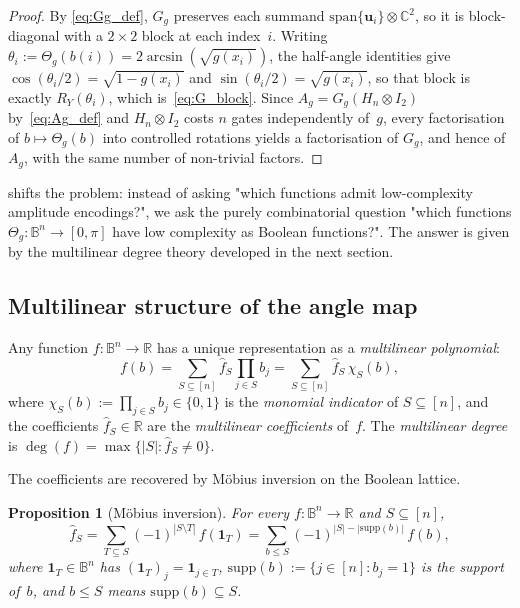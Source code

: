 \documentclass[12pt,a4paper]{article}
\theoremstyle{plain}
\newtheorem{proposition}[proposition]{Proposition}
\theoremstyle{definition}
\theoremstyle{remark}
\newcommand{\R}{\mathbb{R}}
\newcommand{\Thetag}{\Theta_g}
\newcommand{\Iver}[1]{\mathbf{1}_{#1}}
\newcommand{\chimon}[1]{\chi_{#1}}
\newcommand{\indvec}[1]{\mathbf{1}_{#1}}
\begin{document}
\begin{proof}
By \eqref{eq:Gg_def}, $G_g$ preserves each summand
$\mathrm{span}\{\mathbf{u}_i\}\otimes\mathbb{C}^2$, so it is
block-diagonal with a $2\times 2$ block at each index~$i$.
Writing $\theta_i := \Thetag(b(i)) = 2\arcsin(\sqrt{g(x_i)})$, the
half-angle identities give
$\cos(\theta_i/2) = \sqrt{1-g(x_i)}$ and
$\sin(\theta_i/2) = \sqrt{g(x_i)}$, so that block is exactly
$R_Y(\theta_i)$, which is~\eqref{eq:G_block}.
Since $A_g = G_g(H_n\otimes I_2)$ by~\eqref{eq:Ag_def} and
$H_n\otimes I_2$ costs $n$ gates independently of~$g$, every
factorisation of $b\mapsto\Thetag(b)$ into controlled rotations yields
a factorisation of $G_g$, and hence of $A_g$, with the same number of
non-trivial factors.
\end{proof}

 shifts the problem: instead of asking "which
functions admit low-complexity amplitude encodings?", we ask
the purely combinatorial question "which functions $\Thetag:\mathbb{B}^n\to[0,\pi]$
have low complexity as Boolean functions?".
The answer is given by the multilinear degree theory developed in the
next section.

\subsection{Multilinear structure of the angle map}
\label{subsec:multilinear}

Any function $f:\mathbb{B}^n\to\R$ has a unique representation as a
\emph{multilinear polynomial}:
\begin{equation}
  f(b) = \sum_{S\subseteq[n]} \hat{f}_S \prod_{j\in S} b_j
       = \sum_{S\subseteq[n]} \hat{f}_S\,\chimon{S}(b),
  \label{eq:fourier_expansion}
\end{equation}
where $\chimon{S}(b) := \prod_{j\in S} b_j \in \{0,1\}$ is the
\emph{monomial indicator} of $S\subseteq[n]$, and the coefficients
$\hat{f}_S \in \R$ are the \emph{multilinear coefficients} of~$f$.
The \emph{multilinear degree} is
$\deg(f) = \max\{|S| : \hat{f}_S \neq 0\}$.

The coefficients are recovered by Möbius inversion on the Boolean lattice.

\begin{proposition}[Möbius inversion]
\label{prop:mobius}
For every $f:\mathbb{B}^n\to\R$ and $S\subseteq[n]$,
\begin{equation}
  \hat{f}_S
  = \sum_{T\subseteq S}(-1)^{|S\setminus T|}\,f(\indvec{T})
  = \sum_{b\leq S}(-1)^{|S|-|\mathrm{supp}(b)|}\,f(b),
  \label{eq:mobius}
\end{equation}
where $\indvec{T}\in\mathbb{B}^n$ has $(\indvec{T})_j = \Iver{j\in T}$,
$\mathrm{supp}(b) := \{j\in[n] : b_j = 1\}$ is the support of~$b$,
and $b\leq S$ means $\mathrm{supp}(b)\subseteq S$.
\end{proposition}
\end{document}
